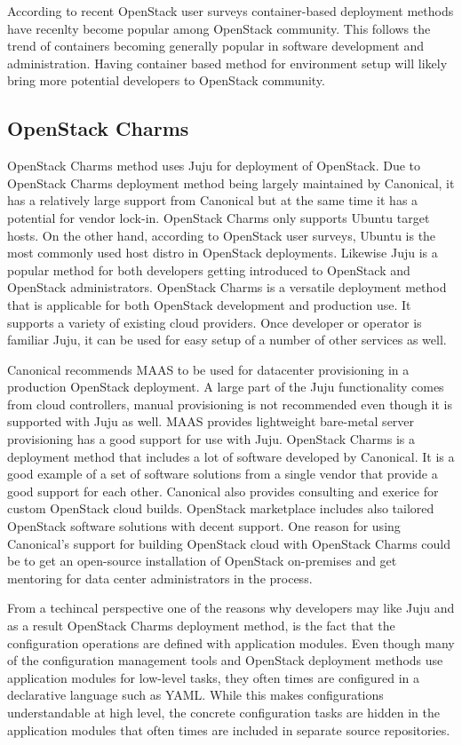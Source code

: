 According to recent OpenStack user surveys container-based deployment methods
have recenlty become popular among OpenStack community. This follows the trend
of containers becoming generally popular in software development and
administration. Having container based method for environment setup will likely
bring more potential developers to OpenStack community.

\subsection{OpenStack Charms}

OpenStack Charms \cite{charm-deployment-guide} method uses Juju for deployment
of OpenStack. Due to OpenStack Charms deployment method being largely
maintained by Canonical, it has a relatively large support from Canonical but
at the same time it has a potential for vendor lock-in. OpenStack Charms only
supports Ubuntu target hosts. On the other hand, according to OpenStack user
surveys, Ubuntu is the most commonly used host distro in OpenStack deployments.
Likewise Juju is a popular method for both developers getting introduced to
OpenStack and OpenStack administrators. OpenStack Charms is a versatile
deployment method that is applicable for both OpenStack development and
production use. It supports a variety of existing cloud providers. Once
developer or operator is familiar Juju, it can be used for easy setup of a
number of other services as well.

Canonical recommends MAAS to be used for datacenter provisioning in a
production OpenStack deployment. A large part of the Juju functionality comes
from cloud controllers, manual provisioning is not recommended even though it
is supported with Juju as well. MAAS provides lightweight bare-metal server
provisioning has a good support for use with Juju. OpenStack Charms is a
deployment method that includes a lot of software developed by Canonical. It is
a good example of a set of software solutions from a single vendor that provide
a good support for each other. Canonical also provides consulting and exerice
for custom OpenStack cloud builds.  OpenStack marketplace includes also
tailored OpenStack software solutions with decent support. One reason for using
Canonical's support for building OpenStack cloud with OpenStack Charms could be
to get an open-source installation of OpenStack on-premises and get mentoring
for data center administrators in the process.

From a techincal perspective one of the reasons why developers may like Juju
and as a result OpenStack Charms deployment method, is the fact that the
configuration operations are defined with application modules. Even though many
of the configuration management tools and OpenStack deployment methods use
application modules for low-level tasks, they often times are configured in a
declarative language such as YAML. While this makes configurations
understandable at high level, the concrete configuration tasks are hidden in
the application modules that often times are included in separate source
repositories.

